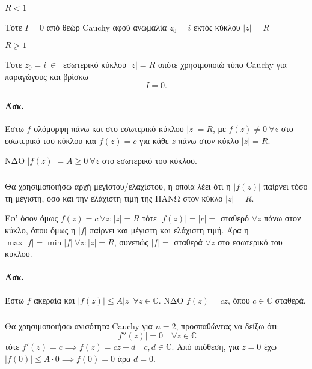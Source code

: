 \documentclass[12pt,a4paper,notitlepage,fleqn]{article}
\begin{document}

    \begin{enumgreekparen}
    	\item \( \underline{R < 1} \)

    	Τότε \( I = 0 \) από θεώρ Cauchy αφού ανωμαλία \( z_0 = i \) εκτός κύκλου
    	\( |z| = R \)

    	\item \( \underline{R>1} \)

    	Τότε \( z_0 = i \ \in \ \) εσωτερικό κύκλου \( |z| = R \) οπότε χρησιμοποιώ τύπο
    	Cauchy για παραγώγους και βρίσκω \[ I = 0. \]
    \end{enumgreekparen}

    \paragraph{Άσκ. }
    Έστω \( f \) ολόμορφη πάνω και στο εσωτερικό κύκλου \( |z| = R \), με
    \( f(z) \neq 0\ \forall z \) στο εσωτερικό του κύκλου και \( f(z) = c \) για κάθε
    \( z \) πάνω στον κύκλο \( |z| = R \).

    ΝΔΟ \( \left|f(z)\right| = A \geq 0 \ \forall z \) στο εσωτερικό του κύκλου.

    \subparagraph{}
    Θα χρησιμοποιήσω αρχή μεγίστου/ελαχίστου, η οποία λέει ότι η \( \left|f(z)\right| \)
    παίρνει τόσο τη μέγιστη, όσο και την ελάχιστη τιμή της ΠΑΝΩ στον κύκλο \( |z|=R \).

    Εφ' όσον όμως \( f(z) = c\ \forall z: |z| = R \) τότε \( \left|f(z)\right| = |c| = \)
    σταθερό \( \forall z \) πάνω στον κύκλο, όπου όμως η \( |f| \) παίρνει και μέγιστη και
    ελάχιστη τιμή. Άρα η \( \max |f| = \min |f| \ \forall z:|z| = R \), συνεπώς
    \( |f| =  \) σταθερά \( \forall z \) στο εσωτερικό του κύκλου.

    \paragraph{Άσκ.}
    Έστω \( f \) ακεραία και \( \left|f(z)\right| \leq A|z|\ \forall z\in\mathbb C  \).
    ΝΔΟ \( f(z) = cz \), όπου \( c \in \mathbb C  \) σταθερά.
    \subparagraph{}
    Θα χρησιμοποιήσω ανισότητα Cauchy για \( n=2 \), προσπαθώντας να δείξω ότι:
    \[
    \left|f''(z)\right| = 0 \quad \forall z \in \mathbb C
    \]
    τότε \( f'(z) = c \implies f(z) = cz+d \quad c,d\in\mathbb C  \). Από υπόθεση,
    για \( z=0 \) έχω \( \left|f(0)\right| \leq A \cdot 0 \implies f(0) = 0 \) άρα \(d = 0\).
\end{document}
